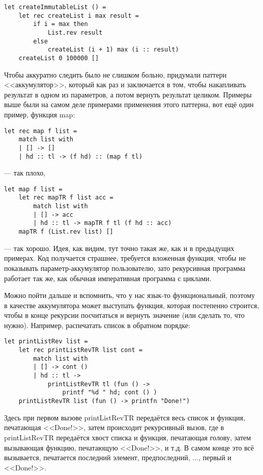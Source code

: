 \documentclass{../../text-style}
\begin{document}
\begin{verbatim}
let createImmutableList () =
    let rec createList i max result =
        if i = max then
            List.rev result
        else
            createList (i + 1) max (i :: result)
    createList 0 100000 []
\end{verbatim}


Чтобы аккуратно следить было не слишком больно, придумали паттерн <<аккумулятор>>, который как раз и заключается в том, чтобы накапливать результат в одном из параметров, а потом вернуть результат целиком. Примеры выше были на самом деле примерами применения этого паттерна, вот ещё один пример, функция map:

\begin{verbatim}
let rec map f list =
    match list with
    | [] -> []
    | hd :: tl -> (f hd) :: (map f tl)
\end{verbatim}

--- так плохо, 

\begin{verbatim}
let map f list =
    let rec mapTR f list acc =
        match list with
        | [] -> acc
        | hd :: tl -> mapTR f tl (f hd :: acc)
    mapTR f (List.rev list) []
\end{verbatim}

--- так хорошо. Идея, как видим, тут точно такая же, как и в предыдущих примерах. Код получается страшнее, требуется вложенная функция, чтобы не показывать параметр-аккумулятор пользователю, зато рекурсивная программа работает так же, как обычная императивная программа с циклами.

Можно пойти дальше и вспомнить, что у нас язык-то функциональный, поэтому в качестве аккумулятора может выступать функция, которая постепенно строится, чтобы в конце рекурсии посчитаться и вернуть значение (или сделать то, что нужно). Например, распечатать список в обратном порядке:

\begin{verbatim}
let printListRev list =
    let rec printListRevTR list cont =
        match list with
        | [] -> cont ()
        | hd :: tl ->
            printListRevTR tl (fun () -> 
                printf "%d " hd; cont () )
    printListRevTR list (fun () -> printfn "Done!")
\end{verbatim}

Здесь при первом вызове printListRevTR передаётся весь список и функция, печатающая <<Done!>>, затем происходит рекурсивный вызов, где в printListRevTR передаётся хвост списка и функция, печатающая голову, затем вызывающая функцию, печатающую <<Done!>>, и т.д. В самом конце это всё вызывается, печатается последний элемент, предпоследний, ..., первый и <<Done!>>.
\end{document}
